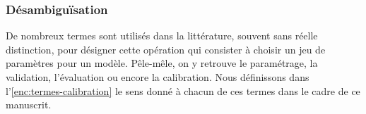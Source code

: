 
\subsubsection{Désambiguïsation}

De nombreux termes sont utilisés dans la littérature, souvent sans réelle distinction, pour désigner cette opération qui consister à choisir un jeu de paramètres pour un modèle.
Pêle-mêle, on y retrouve le paramétrage, la validation, l'évaluation ou encore la calibration.
Nous définissons dans l'\cref{enc:termes-calibration} le sens donné à chacun de ces termes dans le cadre de ce manuscrit.
\bigskip

